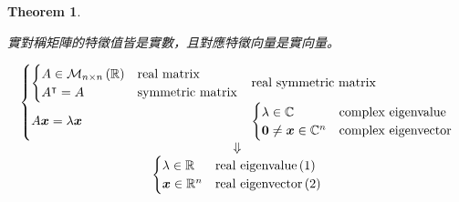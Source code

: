 \documentclass[
]{book}
\newtheorem{theorem}{Theorem}[chapter]
\theoremstyle{definition}
\theoremstyle{definition}
\theoremstyle{definition}
\theoremstyle{definition}
\theoremstyle{remark}
\begin{document}
\begin{theorem}
\protect\hypertarget{thm:real-sym-real-eigen}{}\label{thm:real-sym-real-eigen}\leavevmode

\begin{CJK}{UTF8}{bsmi}
實對稱矩陣的特徵值皆是實數，且對應特徵向量是實向量。
\end{CJK}

\[
\begin{array}{c}
\begin{cases}
\begin{cases}
A\in\mathcal{M}_{n\times n}\left(\mathbb{R}\right) & \textup{real matrix}\\
A^{\intercal}=A & \textup{symmetric matrix}
\end{cases} & \textup{real symmetric matrix}\\
A\boldsymbol{x}=\lambda\boldsymbol{x} & \begin{cases}
\lambda\in\mathbb{C} & \textup{complex eigenvalue}\\
\boldsymbol{0}\ne\boldsymbol{x}\in\mathbb{C}^{n} & \textup{complex eigenvector}
\end{cases}
\end{cases}\\
\Downarrow\\
\begin{cases}
\lambda\in\mathbb{R} & \textup{real eigenvalue}\left(1\right)\\
\boldsymbol{x}\in\mathbb{R}^{n} & \textup{real eigenvector}\left(2\right)
\end{cases}
\end{array}
\]

\end{theorem}
\end{document}
